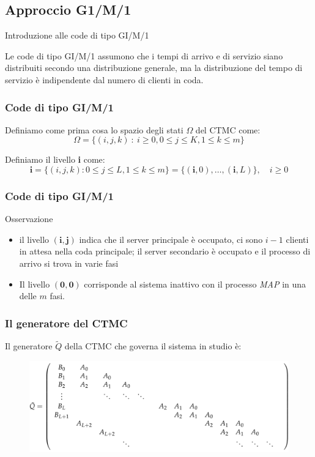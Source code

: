 \documentclass{beamer}
\begin{document}
\subsection{Approccio G1/M/1}


\begin{frame}{Introduzione alle code di tipo GI/M/1}
\begin{block}{}
        Le code di tipo GI/M/1 assumono che i tempi di arrivo e di servizio siano distribuiti secondo una distribuzione generale, ma la distribuzione del tempo di servizio è indipendente dal numero di clienti in coda.
\end{block}
\end{frame}


\begin{frame}
    \frametitle{Code di tipo GI/M/1}
    \begin{block}{}
            Definiamo come prima cosa lo spazio degli stati $\Omega$ del CTMC come:
            $$\Omega = \{ (i,j,k) ~ : ~ i \geq 0, 0 \leq j \leq K, 1 \leq k \leq m \}$$
    \end{block}
    Definiamo il livello \textbf{i} come:
    \begin{equation*}
        \textbf{i} = \{(i, j, k) : 0 \leq j \leq L, 1 \leq k \leq m\} = \{(\textbf{i}, 0), \dots, (\textbf{i}, L)\}, \quad i \geq 0
    \end{equation*}
\end{frame}


\begin{frame}
    \frametitle{Code di tipo GI/M/1}
    \begin{block}{Osservazione}
        \begin{itemize}
            \item il livello $(\textbf{i},\textbf{j})$ indica che il server principale è occupato, ci sono $i-1$ clienti in attesa nella coda principale; il server secondario è occupato e il processo di arrivo si trova in varie fasi
            \item  Il livello $(\textbf{0},\textbf{0})$ corrisponde al sistema inattivo con il processo \emph{MAP} in una delle $m$ fasi.
        \end{itemize}
    \end{block}
\end{frame}


\begin{frame}
    \frametitle{Il generatore del CTMC}
    Il generatore $\widetilde{Q}$ della CTMC che governa il sistema in studio è:
    \begin{figure}
        \centering
        \includegraphics[width=\textwidth]{Isy9B7s.png}
    \end{figure}
\end{frame}
\end{document}
